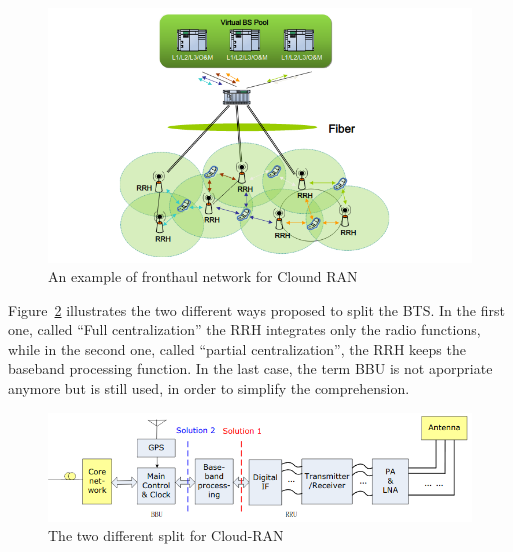 \documentclass[a4paper,10pt]{article}
\begin{document}
  \begin{figure}[h]
      \begin{center}
      \includegraphics[width=1\textwidth]{fronthaul.png}
      \end{center}
      \caption{An example of fronthaul network for Clound RAN}\label{fig:fronthaul}
      \end{figure}
      
      Figure~\ref{fig:CRANsplit} illustrates the two different ways proposed to split the BTS. In the first one, called ``Full centralization'' the RRH integrates only the radio functions, while in the second one, called ``partial centralization'', the RRH keeps the baseband processing function. In the last case, the term BBU is not aporpriate anymore but is still used, in order to simplify the comprehension.
   \begin{figure}[h]
      \begin{center}
      \includegraphics[width=1\textwidth]{CRANsplit.png}
      \end{center}
      \caption{The two different split for Cloud-RAN}\label{fig:CRANsplit}
      \end{figure}
       
\end{document}
